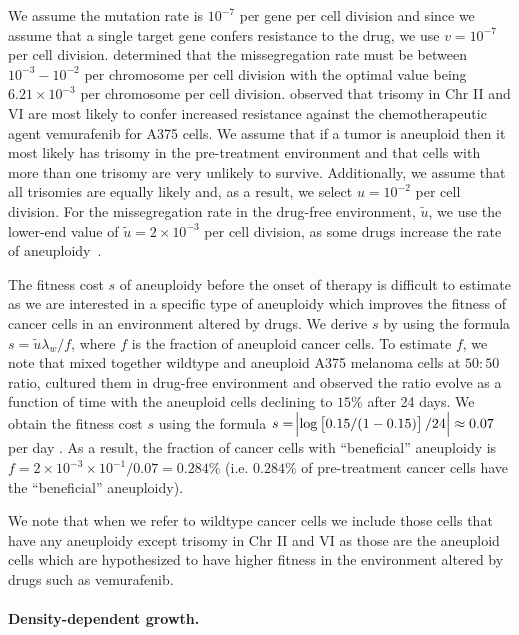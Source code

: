 \documentclass[12pt]{extarticle}
\begin{document}
We assume the mutation rate is $10^{-7}$ per gene per cell division \citep{loeb2001mutator} and since we assume that a single target gene confers resistance to the drug, we use $v=10^{-7}$ per cell division. 
\citet{bakker2023predicting} determined that the missegregation rate must be between $10^{-3}-10^{-2}$ per chromosome per cell division with the optimal value being $6.21\times10^{-3}$ per chromosome per cell division. \citet{ippolito2021gene} observed that trisomy in Chr II and VI are most likely to confer increased resistance against the chemotherapeutic agent vemurafenib for A375 cells. We assume that if a tumor is aneuploid then it most likely has trisomy \citep{gisselsson2010generation} in the pre-treatment environment and that cells with more than one trisomy are very unlikely to survive. Additionally, we assume that all trisomies are equally likely and, as a result, we select $u=10^{-2}$ per cell division. For the missegregation rate in the drug-free environment, $\tilde{u}$, we use the lower-end value of $\tilde{u}=2\times10^{-3}$ per cell division, as some drugs increase the rate of aneuploidy~\citep{wang2019molecular,mason2017functional}.

The fitness cost $s$ of aneuploidy before the onset of therapy is difficult to estimate as we are interested in a specific type of aneuploidy which improves the fitness of cancer cells in an environment altered by drugs.
We derive $s$ by using the formula $s=\tilde{u}\lambda_w / f$, where $f$ is the fraction of aneuploid cancer cells. To estimate $f$, we note that \citet{lukow2021chromosomal} mixed together wildtype and aneuploid A375 melanoma cells at $50:50$ ratio, cultured them in drug-free environment and observed the ratio evolve as a function of time with the aneuploid cells declining to $15\%$ after 24 days. We obtain the fitness cost $s$ using the formula $s=\abs{\log\left[0.15/(1-0.15)\right]/24}\approx0.07$ per day \citep{chevin2011measuring}. As a result, the fraction of cancer cells with ``beneficial'' aneuploidy is $f=2\times10^{-3}\times10^{-1}/0.07=0.284\%$ (i.e. $0.284\%$ of pre-treatment cancer cells have the ``beneficial'' aneuploidy).


We note that when we refer to wildtype cancer cells we include those cells that have any aneuploidy except trisomy in Chr II and VI as those are the aneuploid cells which are hypothesized to have higher fitness in the environment altered by drugs such as vemurafenib.

\paragraph{Density-dependent growth.}
\end{document}
